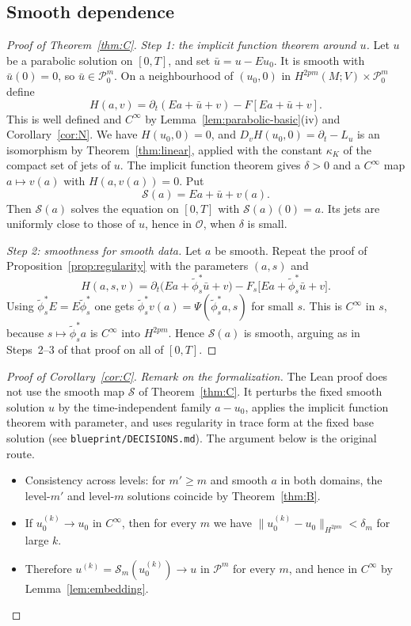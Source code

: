 \documentclass[11pt,reqno]{amsart}
\theoremstyle{definition}
\theoremstyle{remark}
\newcommand{\Pp}{\mathcal{P}}
\newcommand{\Par}{\mathcal{O}}
\newcommand{\norm}[1]{\lVert #1\rVert}
\newcommand{\uses}[1]{}
\numberwithin{equation}{section}
\begin{document}
\subsection{Smooth dependence}

\begin{proof}[Proof of Theorem~\ref{thm:C}]
\uses{thm:linear, cor:N, fact:ift, lem:flows, prop:regularity, lem:parabolic-basic}
\emph{Step 1: the implicit function theorem around $u$.} Let $u$ be a parabolic solution on $[0,T]$,
and set $\bar u=u-Eu_0$. It is smooth with $\bar u(0)=0$, so $\bar u\in\Pp^m_0$. On a neighbourhood of
$(u_0,0)$ in $H^{2pm}(M;V)\times\Pp^m_0$ define
\[
  H(a,v)=\partial_t(Ea+\bar u+v)-F[Ea+\bar u+v].
\]
This is well defined and $C^\infty$ by Lemma~\ref{lem:parabolic-basic}(iv) and Corollary~\ref{cor:N}.
We have $H(u_0,0)=0$, and $D_vH(u_0,0)=\partial_t-L_u$ is an isomorphism by
Theorem~\ref{thm:linear}, applied with the constant
$\kappa_K$ of the compact set of jets of $u$. The implicit function theorem gives $\delta>0$ and a
$C^\infty$ map $a\mapsto v(a)$ with $H(a,v(a))=0$. Put
\[
  \mathcal S(a)=Ea+\bar u+v(a).
\]
Then $\mathcal S(a)$ solves the equation on $[0,T]$ with $\mathcal S(a)(0)=a$. Its jets are uniformly
close to those of $u$, hence in $\Par$, when $\delta$ is small.

\emph{Step 2: smoothness for smooth data.} Let $a$ be smooth. Repeat the proof of
Proposition~\ref{prop:regularity} with the parameters $(a,s)$ and
\[
  H(a,s,v)=\partial_t\bigl(Ea+\tilde\phi_s^*\bar u+v\bigr)-F_s\bigl[Ea+\tilde\phi_s^*\bar u+v\bigr].
\]
Using $\tilde\phi_s^*E=E\tilde\phi_s^*$ one gets
$\tilde\phi_s^*v(a)=\Psi(\tilde\phi_s^*a,s)$ for small $s$. This is $C^\infty$ in $s$, because
$s\mapsto\tilde\phi_s^*a$ is $C^\infty$ into $H^{2pm}$. Hence $\mathcal S(a)$ is smooth, arguing as in
Steps~2--3 of that proof on all of $[0,T]$.
\end{proof}

\begin{proof}[Proof of Corollary~\ref{cor:C}]
\uses{thm:C, thm:B, lem:embedding}
\emph{Remark on the formalization.} The Lean proof does not use the smooth map $\mathcal S$ of
Theorem~\ref{thm:C}. It perturbs the fixed smooth solution $u$ by the time-independent family
$a-u_0$, applies the implicit function theorem with parameter, and uses regularity in trace form at
the fixed base solution (see \texttt{blueprint/DECISIONS.md}). The argument below is the original route.
\begin{itemize}[nosep]
\item Consistency across levels: for $m'\ge m$ and smooth $a$ in both domains, the level-$m'$ and
  level-$m$ solutions coincide by Theorem~\ref{thm:B}.
\item If $u_0^{(k)}\to u_0$ in $C^\infty$, then for every $m$ we have
  $\norm{u_0^{(k)}-u_0}_{H^{2pm}}<\delta_m$ for large $k$.
\item Therefore $u^{(k)}=\mathcal S_m(u_0^{(k)})\to u$ in $\Pp^m$ for every $m$, and hence in
  $C^\infty$ by Lemma~\ref{lem:embedding}.
\end{itemize}
\end{proof}
\end{document}
